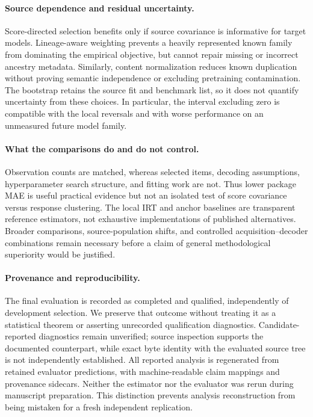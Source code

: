 \documentclass{article}
\begin{document}
\paragraph{Source dependence and residual uncertainty.}
Score-directed selection benefits only if source covariance is informative for target models. Lineage-aware weighting prevents a heavily represented known family from dominating the empirical objective, but cannot repair missing or incorrect ancestry metadata. Similarly, content normalization reduces known duplication without proving semantic independence or excluding pretraining contamination. The bootstrap retains the source fit and benchmark list, so it does not quantify uncertainty from these choices. In particular, the interval excluding zero is compatible with the local reversals and with worse performance on an unmeasured future model family.

\paragraph{What the comparisons do and do not control.}
Observation counts are matched, whereas selected items, decoding assumptions, hyperparameter search structure, and fitting work are not. Thus lower package MAE is useful practical evidence but not an isolated test of score covariance versus response clustering. The local IRT and anchor baselines are transparent reference estimators, not exhaustive implementations of published alternatives. Broader comparisons, source-population shifts, and controlled acquisition--decoder combinations remain necessary before a claim of general methodological superiority would be justified.

\paragraph{Provenance and reproducibility.}
The final evaluation is recorded as completed and qualified, independently of development selection. We preserve that outcome without treating it as a statistical theorem or asserting unrecorded qualification diagnostics. Candidate-reported diagnostics remain unverified; source inspection supports the documented counterpart, while exact byte identity with the evaluated source tree is not independently established. All reported analysis is regenerated from retained evaluator predictions, with machine-readable claim mappings and provenance sidecars. Neither the estimator nor the evaluator was rerun during manuscript preparation. This distinction prevents analysis reconstruction from being mistaken for a fresh independent replication.
\end{document}
